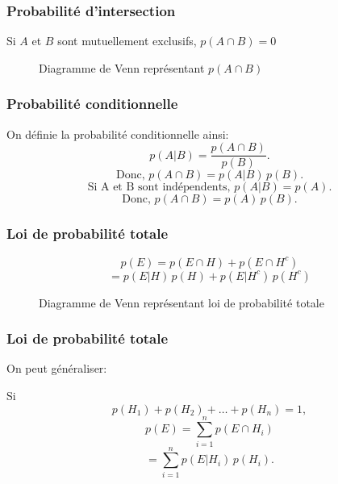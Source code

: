 \documentclass{beamer}
\begin{document}


\begin{frame}
    \frametitle{Probabilité d'intersection}
    Si $A$ et $B$ sont mutuellement exclusifs, $p(A \cap B) = 0$    
    \begin{figure}
      \centering
      
      \caption{Diagramme de Venn représentant $p(A \cap B)$}
    \end{figure}
\end{frame}


\begin{frame}
    \frametitle{Probabilité conditionnelle}
    On définie la probabilité conditionnelle ainsi:
    \[p(A | B) = \frac{p(A \cap B)}{p(B)}.\]
    \pause
    \[\textrm{Donc,} \, \, p(A \cap B) = p(A | B) \, p(B).\]
    \pause
    \[\textrm{Si A et B sont indépendents,} \, \, p(A | B) = p(A).\]
    \pause
    \[\textrm{Donc,} \, \, p(A \cap B) = p(A) \, p(B).\]
\end{frame}


\begin{frame}
    \frametitle{Loi de probabilité totale}
    \[p(E) = p(E \cap H) + p(E \cap H^c)\]
    \[ = p(E | H) \, p(H) + p(E | H^c) \, p(H^c)\]
    \pause
    \begin{figure}
      \centering
      
      \caption{Diagramme de Venn représentant loi de probabilité totale}
    \end{figure}
\end{frame}


\begin{frame}
    \frametitle{Loi de probabilité totale}
    On peut généraliser:

    \pause

    \vfill

    Si 
    \[p(H_1) + p(H_2) + \ldots + p(H_n) = 1,\]
    \pause
    \[p(E) = \sum_{i=1}^{n} p(E \cap H_i)\]
    \pause
    \[= \sum_{i=1}^{n} p(E | H_i) \, p(H_i).\]
\end{frame}
\end{document}
